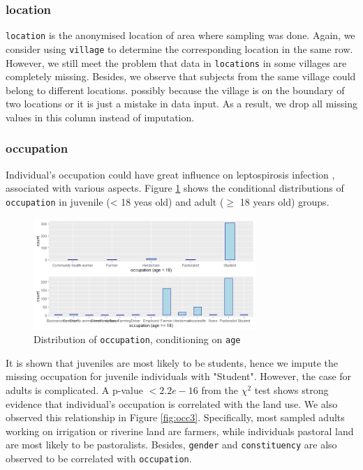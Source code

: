 \documentclass[11pt,twoside]{article}
\numberwithin{Theorem}{section}
\numberwithin{Definition}{section}
\numberwithin{Lemma}{section}
\numberwithin{Algorithm}{section}
\numberwithin{equation}{section}
\begin{document}
\subsubsection{location}

\texttt{location} is the anonymised location of area where sampling was done. Again, we consider using \texttt{village} to determine the corresponding location in the same row. However, we still meet the problem that data in \texttt{locations} in some villages are completely missing. Besides, we observe that subjects from the same village could belong to different locations. possibly because the village is on the boundary of two locations or it is just a mistake in data input. As a result, we drop all missing values in this column instead of imputation.

\subsubsection{occupation}

Individual's occupation could have great influence on leptospirosis infection \cite{cook2017risk}, associated with various aspects. Figure \ref{fig:occ1} shows the conditional distributions of \texttt{occupation} in juvenile (< 18 yeas old) and adult ($\geq$ 18 years old) groups. 

\begin{figure}[!h]
	\centering
	\includegraphics[width = 0.75\textwidth]{Images/occupation_age.png}
	\caption{Distribution of \texttt{occupation}, conditioning on \texttt{age}}
	\label{fig:occ1}
\end{figure}

It is shown that juveniles are most likely to be students, hence we impute the missing occupation for juvenile individuals with "Student". However, the case for adults is complicated. A p-value $<2.2e-16$ from the $\chi^2$ test shows strong evidence that individual's occupation is correlated with the land use. We also observed this relationship in Figure \ref{fig:occ3}. Specifically, most sampled adults working on irrigation or riverine land are farmers, while individuals pastoral land are most likely to be pastoralists. Besides, \texttt{gender} and \texttt{constituency} are also observed to be correlated with \texttt{occupation}. 
\end{document}
